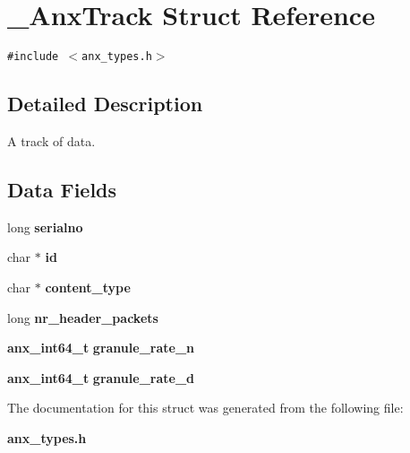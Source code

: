 \section{\_\-Anx\-Track Struct Reference}
\label{struct__AnxTrack}
{\tt \#include $<$anx\_\-types.h$>$}



\subsection{Detailed Description}
A track of data. 

\subsection*{Data Fields}
\begin{CompactItemize}
\item 
long {\bf serialno}\label{struct__AnxTrack_o0}

\item 
char $\ast$ {\bf id}\label{struct__AnxTrack_o1}

\item 
char $\ast$ {\bf content\_\-type}\label{struct__AnxTrack_o2}

\item 
long {\bf nr\_\-header\_\-packets}\label{struct__AnxTrack_o3}

\item 
{\bf anx\_\-int64\_\-t} {\bf granule\_\-rate\_\-n}\label{struct__AnxTrack_o4}

\item 
{\bf anx\_\-int64\_\-t} {\bf granule\_\-rate\_\-d}\label{struct__AnxTrack_o5}

\end{CompactItemize}


The documentation for this struct was generated from the following file:\begin{CompactItemize}
\item 
{\bf anx\_\-types.h}\end{CompactItemize}
